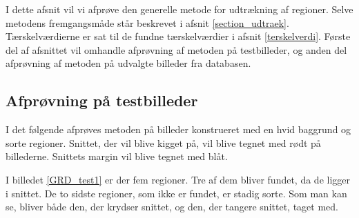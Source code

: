 
{\sffamily I dette afsnit vil vi afprøve den generelle metode for udtrækning af
regioner. Selve metodens fremgangsmåde står beskrevet i afsnit
\ref{section_udtraek}. Tærskelværdierne er sat til de fundne
tærskelværdier i afsnit \ref{terskelverdi}. Første del af afsnittet vil
omhandle afprøvning af metoden på testbilleder, og anden del afprøvning
af metoden på udvalgte billeder fra databasen.}

\subsection{Afprøvning på testbilleder}
I det følgende afprøves metoden på billeder konstrueret med en hvid
baggrund og sorte regioner. Snittet, der vil blive kigget på, vil
blive tegnet med rødt på billederne. Snittets margin vil blive tegnet med blåt.

I billedet \ref{GRD_test1} er der fem regioner. Tre af dem bliver
fundet, da de ligger i snittet. De to sidste regioner, som ikke er fundet, er
stadig sorte. Som man kan se, bliver både den, der krydser snittet, og den,
der tangere snittet, taget med. 

\begin{figure}[!h]
    \centering
    	\hspace{1em}
		\hspace{1em}
        \caption[]{}
     \label{GRD_test1_sammen}
\end{figure}

